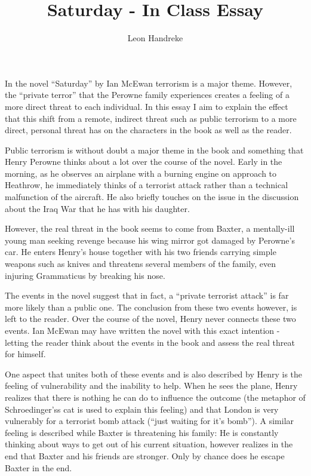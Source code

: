 \documentclass[11pt]{article}
\title{Saturday - In Class Essay}
\author{Leon Handreke}
\date{}                                           %
\begin{document}
\onehalfspacing

\maketitle
{}\selectfont

In the novel ``Saturday'' by Ian McEwan terrorism is a major theme. However, the ``private terror'' that the Perowne family experiences creates a feeling of a more direct threat to each individual. In this essay I aim to explain the effect that this shift from a remote, indirect threat such as public terrorism to a more direct, personal threat has on the characters in the book as well as the reader.

Public terrorism is without doubt a major theme in the book and something that Henry Perowne thinks about a lot over the course of the novel. Early in the morning, as he observes an airplane with a burning engine on approach to Heathrow, he immediately thinks of a terrorist attack rather than a technical malfunction of the aircraft. He also briefly touches on the issue in the discussion about the Iraq War that he has with his daughter.

However, the real threat in the book seems to come from Baxter, a mentally-ill young man seeking revenge because his wing mirror got damaged by Perowne's car. He enters Henry's house together with his two friends carrying simple weapons such as knives and threatens several members of the family, even injuring Grammaticus by breaking his nose.

The events in the novel suggest that in fact, a ``private terrorist attack'' is far more likely than a public one. The conclusion from these two events however, is left to the reader. Over the course of the novel, Henry never connects these two events. Ian McEwan may have written the novel with this exact intention - letting the reader think about the events in the book and assess the real threat for himself.

One aspect that unites both of these events and is also described by Henry is the feeling of vulnerability and the inability to help. When he sees the plane, Henry realizes that there is nothing he can do to influence the outcome (the metaphor of Schroedinger'ss cat is used to explain this feeling) and that London is very vulnerably for a terrorist bomb attack (``just waiting for it's bomb''). A similar feeling is described while Baxter is threatening his family: He is constantly thinking about ways to get out of his current situation, however realizes in the end that Baxter and his friends are stronger. Only by chance does he escape Baxter in the end.
\end{document}
